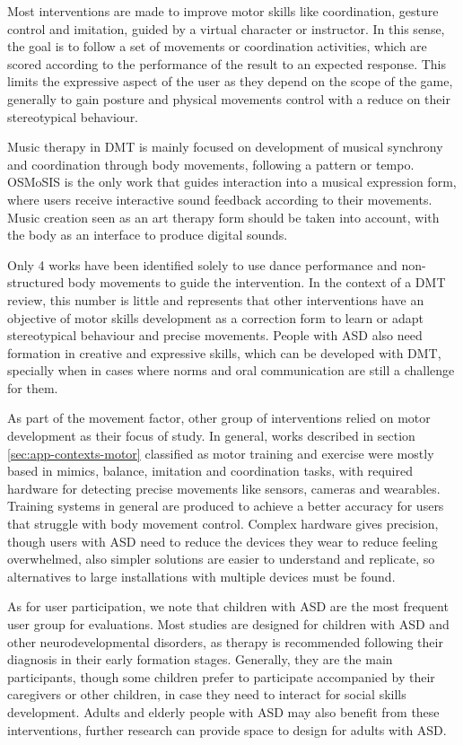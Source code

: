 \documentclass[a4paper,fleqn]{cas-sc}
\begin{document}
Most interventions are made to improve motor skills like coordination, gesture control and imitation, guided by a virtual character or instructor. In this sense, the goal is to follow a set of movements or coordination activities, which are scored according to the performance of the result to an expected response. This limits the expressive aspect of the user as they depend on the scope of the game, generally to gain posture and physical movements control with a reduce on their stereotypical behaviour.

Music therapy in DMT is mainly focused on development of musical synchrony and coordination through body movements, following a pattern or tempo.
OSMoSIS \cite{Ragone20OS, Ragone22} is the only work that guides interaction into a musical expression form, where users receive interactive sound feedback according to their movements.  Music creation seen as an art therapy form should be taken into account, with the body as an interface to produce digital sounds. 

Only 4 works have been identified solely to use dance performance and non-structured body movements to guide the intervention. In the context of a DMT review, this number is little and represents that other interventions have an objective of motor skills development as a correction form to learn or adapt stereotypical behaviour and precise movements. People with ASD also need formation in creative and expressive skills, which can be developed with DMT, specially when in cases where norms and oral communication are still a challenge for them.

As part of the movement factor, other group of interventions relied on motor development as their focus of study. In general, works described in section \ref{sec:app-contexts-motor} classified as motor training and exercise were mostly based in mimics, balance, imitation and coordination tasks, with required hardware for detecting precise movements like sensors, cameras and wearables. Training systems in general are produced to achieve a better accuracy for users that struggle with body movement control. Complex hardware gives precision, though users with ASD need to reduce the devices they wear to reduce feeling overwhelmed, also simpler solutions are easier to understand and replicate, so alternatives to large installations with multiple devices must be found.

As for user participation, we note that children with ASD are the most frequent user group for evaluations.
Most studies are designed for children with ASD and other neurodevelopmental disorders, as therapy is recommended following their diagnosis in their early formation stages. Generally, they are the main participants, though some children prefer to participate accompanied by their caregivers or other children, in case they need to interact for social skills development.
Adults and elderly people with ASD may also benefit from these interventions, further research can provide space to design for adults with ASD.
\end{document}
